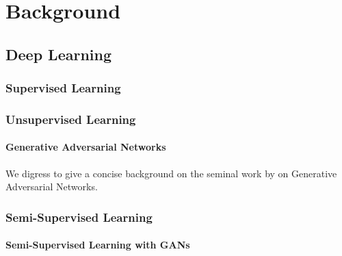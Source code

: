 \chapter{Background}
\label{chapter:body}
\thispagestyle{myheadings}

\graphicspath{{2_Body/Figures/}}

\section{Deep Learning}
\subsection{Supervised Learning}

\subsection{Unsupervised Learning}
\subsubsection{Generative Adversarial Networks}
We digress to give a concise background on the seminal work by \cite{goodfellow2014generative} on Generative Adversarial Networks.

\subsection{Semi-Supervised Learning}
\subsubsection{Semi-Supervised Learning with GANs}
\cite{salimans2016improved}